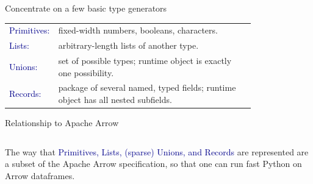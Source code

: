 \documentclass[aspectratio=169]{beamer}
\begin{document}
\begin{frame}{Concentrate on a few basic type generators}
\vspace{0.5 cm}
\large

\renewcommand{\arraystretch}{2}
\begin{tabular}{l p{0.8\linewidth}}
\textcolor{darkblue}{{\Huge P}{\LARGE rimitives:}} & fixed-width numbers, booleans, characters. \\
\textcolor{darkblue}{{\Huge L}{\LARGE ists:}} & arbitrary-length lists of another type. \\
\textcolor{darkblue}{{\Huge U}{\LARGE nions:}} & set of possible types; runtime object is exactly one possibility. \\
\textcolor{darkblue}{{\Huge R}{\LARGE ecords:}} & package of several named, typed fields; runtime object has all nested subfields.
\end{tabular}

\normalsize
\vspace{0.2 cm}

\vspace{0.2 cm}

\vspace{0.2 cm}
\end{frame}

\begin{frame}{Relationship to Apache Arrow}
\large

\begin{columns}
\begin{center}
The way that \textcolor{darkblue}{Primitives, Lists, (sparse) Unions, and Records} are represented are a subset of the Apache Arrow specification, so that one can run fast Python on Arrow dataframes.

\vspace{0.75 cm}
\end{center}
\end{columns}
\end{frame}
\end{document}
